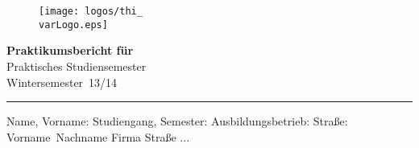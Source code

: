 \documentclass[a4paper,11pt,DIV=11]{scrreprt}
\newcommand{\varLogo}{ei} %
\newcommand{\varType}{Praktisches Studiensemester} %
\newcommand{\varTerm}{Wintersemester} %
\newcommand{\varYear}{13/14}
\newcommand{\varSurname}{Vorname}
\newcommand{\varLastname}{Nachname}
\newcommand{\varCompany}{Firma}
\newcommand{\varStreet}{Stra\ss{}e}
\begin{document}
	
\setlength\parindent{0pt}
	
\begin{titlepage}

	\begin{figure}[h!] %
		\raggedleft
		\texttt{[image: logos/thi\_\\varLogo.eps]}
	\end{figure}
	
	\vspace{0.5cm}
	
	\begin{large}
	\textbf{
		{\LARGE Praktikumsbericht f\"ur} \\[3ex]
	}
	{\varType} \\[1.5ex]
	{\varTerm~\varYear} \\[1.5ex]
	
	\noindent\hrule
	
	\vspace{0.5cm}
	
	\begin{multicols}{2}
	Name, Vorname:\newline
	Studiengang, Semester: \newline
	Ausbildungsbetrieb:\newline
	Stra\ss{}e:\newline
	\vfill \columnbreak
	\varSurname~\varLastname \newline
	\varCompany \newline
	\varStreet \newline
	...
	
	\end{multicols}
	\end{large}
\end{titlepage}
\end{document}
